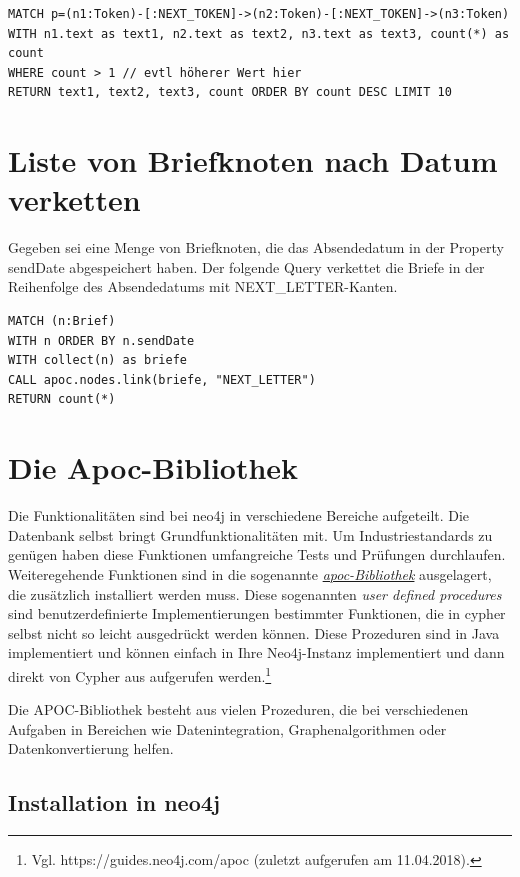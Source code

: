 \documentclass[ngerman,]{scrreprt}
\begin{document}
\begin{verbatim}
MATCH p=(n1:Token)-[:NEXT_TOKEN]->(n2:Token)-[:NEXT_TOKEN]->(n3:Token)
WITH n1.text as text1, n2.text as text2, n3.text as text3, count(*) as count
WHERE count > 1 // evtl höherer Wert hier
RETURN text1, text2, text3, count ORDER BY count DESC LIMIT 10
\end{verbatim}

\section{Liste von Briefknoten nach Datum verketten}\label{liste-von-briefknoten-nach-datum-verketten}

Gegeben sei eine Menge von Briefknoten, die das Absendedatum in der Property sendDate abgespeichert haben. Der folgende Query verkettet die Briefe in der Reihenfolge des Absendedatums mit NEXT\_LETTER-Kanten.

\begin{verbatim}
MATCH (n:Brief) 
WITH n ORDER BY n.sendDate
WITH collect(n) as briefe
CALL apoc.nodes.link(briefe, "NEXT_LETTER")
RETURN count(*)
\end{verbatim}

\section{Die Apoc-Bibliothek}\label{die-apoc-bibliothek}

Die Funktionalitäten sind bei neo4j in verschiedene Bereiche aufgeteilt. Die Datenbank selbst bringt Grundfunktionalitäten mit. Um Industriestandards zu genügen haben diese Funktionen umfangreiche Tests und Prüfungen durchlaufen. Weiteregehende Funktionen sind in die sogenannte \href{https://guides.neo4j.com/apoc}{\emph{apoc-Bibliothek}} ausgelagert, die zusätzlich installiert werden muss. Diese sogenannten \emph{user defined procedures} sind benutzerdefinierte Implementierungen bestimmter Funktionen, die in cypher selbst nicht so leicht ausgedrückt werden können. Diese Prozeduren sind in Java implementiert und können einfach in Ihre Neo4j-Instanz implementiert und dann direkt von Cypher aus aufgerufen werden.\footnote{Vgl. https://guides.neo4j.com/apoc (zuletzt aufgerufen am 11.04.2018).}

Die APOC-Bibliothek besteht aus vielen Prozeduren, die bei verschiedenen Aufgaben in Bereichen wie Datenintegration, Graphenalgorithmen oder Datenkonvertierung helfen.

\subsection{Installation in neo4j}\label{installation-in-neo4j}
\end{document}
